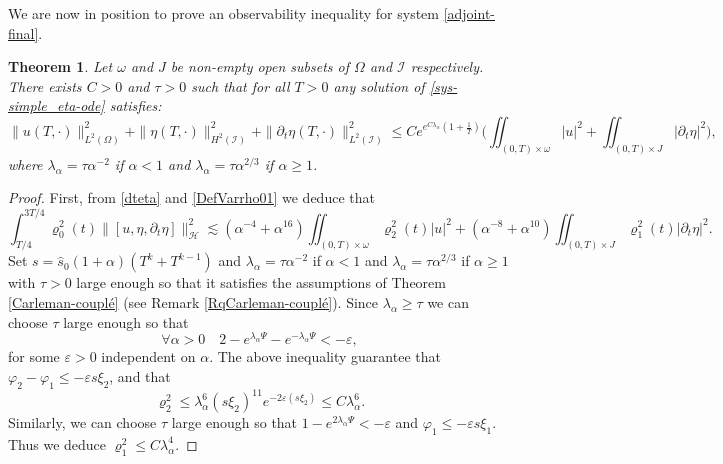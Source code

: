 \documentclass[a4paper, 12pt]{article}
\theoremstyle{plain}
\newtheorem{theorem}{Theorem}[section]
\theoremstyle{definition}
\numberwithin{theorem}{section}
\numberwithin{equation}{section}
\begin{document}
{We are now in position to prove an observability inequality for system \eqref{adjoint-final}.
\begin{theorem}\label{observability}
Let $\omega$ and $J$ be non-empty open subsets of $\Omega$ and $\mathcal{I}$ respectively. There exists $C>0$ and $\tau>0$ such that for all $T>0$ any solution of \eqref{sys-simple_eta-ode} satisfies:
\begin{equation}\label{inegalite-obs}
\|u(T,\cdot)\|^2_{L^2(\Omega)}+\|\eta(T,\cdot)\|^2_{H^2(\mathcal{I})}+\|\partial_t\eta(T,\cdot)\|^2_{L^2(\mathcal{I})} \leq Ce^{e^{C\lambda_\alpha}\left(1+\frac{1}{T}\right)}\Big(\iint_{(0,T)\times \omega}|u|^2+\iint_{(0,T)\times J}|\partial_t\eta|^2\Big),
\end{equation}
where $\lambda_\alpha=\tau\alpha^{-2}$ if $\alpha<1$ and $\lambda_\alpha=\tau\alpha^{2/3}$ if $\alpha\geq 1$.
\end{theorem}
\begin{proof}
First, from \eqref{dteta} and \eqref{DefVarrho01} we deduce that
\begin{equation}\label{Est11-03}
\int_{T/4}^{3T/4}\varrho^2_0(t)\|[u,\eta,\partial_t\eta]\|^2_{\mathscr{H}}\lesssim (\alpha^{-4}+\alpha^{16})\iint_{(0,T)\times\omega}\varrho^2_2(t)|u|^2+ (\alpha^{-8}+\alpha^{10})\iint_{(0,T)\times J}\varrho^2_1(t)|\partial_t\eta|^2.
\end{equation}
Set $s=\widehat{s}_0(1+\alpha)(T^k+T^{k-1})$ and $\lambda_\alpha=\tau\alpha^{-2}$ if $\alpha<1$ and $\lambda_\alpha=\tau\alpha^{2/3}$ if $\alpha\geq 1$ with $\tau>0$ large enough so that it satisfies the assumptions of Theorem \ref{Carleman-couplé} (see Remark \ref{RqCarleman-couplé}). Since $\lambda_\alpha\geq \tau$ we can choose $\tau$ large enough so that
$$
\forall\alpha>0\quad 2-e^{\lambda_\alpha\Psi}-e^{-\lambda_\alpha\Psi}<-\varepsilon,
$$
for some $\varepsilon>0$ independent on $\alpha$. The above inequality guarantee that $\varphi_2-\varphi_1\leq -\varepsilon s \xi_2$, and that 
$$
\varrho_2^2\leq \lambda_\alpha^6(s\xi_2)^{11} e^{-2\varepsilon  (s \xi_2)}\leq C \lambda_\alpha^6.
$$
Similarly, we can choose $\tau$ large enough so that $1-e^{2\lambda_\alpha\Psi}<-\varepsilon$ and $\varphi_1\leq -\varepsilon s \xi_1$. Thus we deduce $\varrho_1^2\leq C \lambda_\alpha^4$.


\end{proof}}
\end{document}
